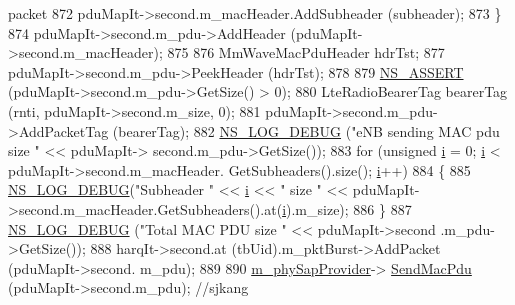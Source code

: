 \begin{DoxyCode}
{       packet}
872                                                 pduMapIt->second.m\_macHeader.AddSubheader (subheader);
873                                         \}
874                                         pduMapIt->second.m\_pdu->AddHeader (pduMapIt->second.m\_macHeader);
875 
876                                         MmWaveMacPduHeader hdrTst;
877                                         pduMapIt->second.m\_pdu->PeekHeader (hdrTst);
878 
879                                         \hyperlink{assert_8h_a6dccdb0de9b252f60088ce281c49d052}{NS\_ASSERT} (pduMapIt->second.m\_pdu->GetSize() > 0);
880                                         LteRadioBearerTag bearerTag (rnti, pduMapIt->second.m\_size, 0);
881                                         pduMapIt->second.m\_pdu->AddPacketTag (bearerTag);
882                                         \hyperlink{group__logging_ga413f1886406d49f59a6a0a89b77b4d0a}{NS\_LOG\_DEBUG} (\textcolor{stringliteral}{"eNB sending MAC pdu size "} << pduMapIt->
      second.m\_pdu->GetSize());
883                                         \textcolor{keywordflow}{for} (\textcolor{keywordtype}{unsigned} \hyperlink{bernuolliDistribution_8m_a6f6ccfcf58b31cb6412107d9d5281426}{i} = 0; \hyperlink{bernuolliDistribution_8m_a6f6ccfcf58b31cb6412107d9d5281426}{i} < pduMapIt->second.m\_macHeader.
      GetSubheaders().size(); \hyperlink{bernuolliDistribution_8m_a6f6ccfcf58b31cb6412107d9d5281426}{i}++)
884                                         \{
885                                                 \hyperlink{group__logging_ga413f1886406d49f59a6a0a89b77b4d0a}{NS\_LOG\_DEBUG}(\textcolor{stringliteral}{"Subheader "} << 
      \hyperlink{bernuolliDistribution_8m_a6f6ccfcf58b31cb6412107d9d5281426}{i} << \textcolor{stringliteral}{" size "} << pduMapIt->second.m\_macHeader.GetSubheaders().at(\hyperlink{bernuolliDistribution_8m_a6f6ccfcf58b31cb6412107d9d5281426}{i}).m\_size);
886                                         \}
887                                         \hyperlink{group__logging_ga413f1886406d49f59a6a0a89b77b4d0a}{NS\_LOG\_DEBUG} (\textcolor{stringliteral}{"Total MAC PDU size "} << pduMapIt->second
      .m\_pdu->GetSize());
888                                         harqIt->second.at (tbUid).m\_pktBurst->AddPacket (pduMapIt->second.
      m\_pdu);
889 
890                                         \hyperlink{classns3_1_1MmWaveEnbMac_a0bfb3ea8d3d00e3c92ac3a554602d40b}{m\_phySapProvider}->
      \hyperlink{classns3_1_1MmWavePhySapProvider_ae7f41f77600402396e041eded35999fb}{SendMacPdu} (pduMapIt->second.m\_pdu); \textcolor{comment}{//sjkang}

\end{DoxyCode}
